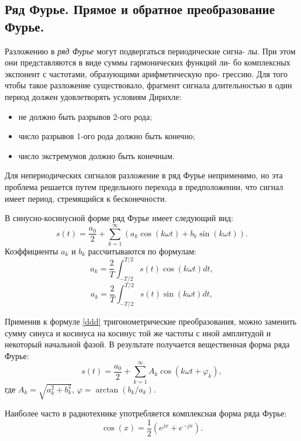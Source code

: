 \documentclass[a4paper,14pt]{extarticle}
\begin{document}
\subsection{Ряд Фурье. Прямое и обратное преобразование Фурье.}
Разложению в \textit{ряд Фурье} могут подвергаться периодические сигна-
лы. При этом они представляются в виде суммы гармонических функций ли-
бо комплексных экспонент с частотами, образующими арифметическую про-
грессию. Для того чтобы такое разложение существовало, фрагмент сигнала
длительностью в один период должен удовлетворять условиям Дирихле:
\begin{itemize}
\item не должно быть разрывов 2-ого рода;
\item число разрывов 1-ого рода должно быть конечно;
\item число экстремумов должно быть конечным.
\end{itemize}
Для непериодических сигналов разложение в ряд Фурье неприменимо,
но эта проблема решается путем предельного перехода в предположении, что
сигнал имеет период, стремящийся к бесконечности.

В синусно-косинусной форме ряд Фурье имеет следующий вид:
\begin{equation}
s(t) = \frac{a_0}{2} + \sum_{k=1}^\infty (a_k \cos(k\omega t) + b_k \sin(k\omega t)).
\label{ddd}
\end{equation}
Коэффициенты $a_k$ и $b_k$ рассчитываются по формулам:
\begin{equation*}
a_k = \frac{2}{T} \int_{-T/2}^{T/2} s(t) \cos (k\omega t) dt,
\end{equation*}
\begin{equation*}
a_k = \frac{2}{T} \int_{-T/2}^{T/2} s(t) \sin (k\omega t) dt,
\end{equation*}

Применив к формуле \ref{ddd} тригонометрические преобразования, можно
заменить сумму синуса и косинуса на косинус той же частоты с иной амплитудой и некоторый начальной фазой. В результате получается вещественная форма ряда Фурье:
\begin{equation*}
s(t) = \frac{a_0}{2} + \sum_{k=1}^\infty A_k \cos(k\omega t + \varphi_k),
\end{equation*}
где $A_k = \sqrt{a_k^2 + b_k^2}$, $\varphi = \arctan(b_k/a_k)$.

Наиболее часто в радиотехнике употребляется комплексная форма ряда Фурье:
\begin{equation*}
\cos (x) = \frac{1}{2} (e^{jx} + e^{-jx}).
\end{equation*}
\end{document}
